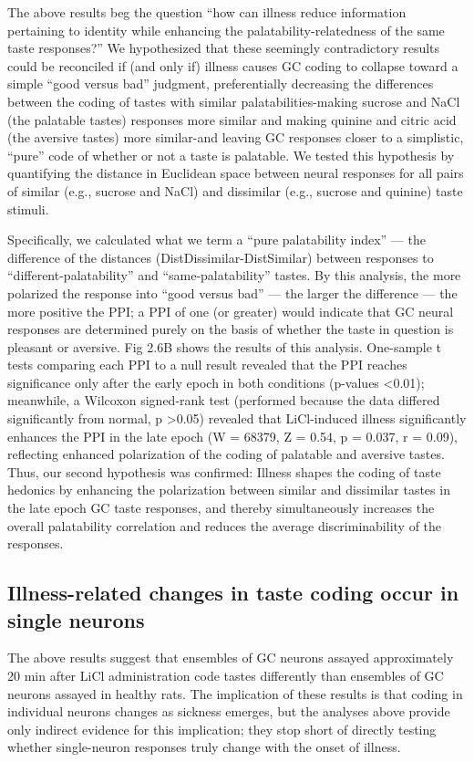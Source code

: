 \begin{refsection}
The above results beg the question “how can illness reduce information pertaining to identity while enhancing the palatability-relatedness of the same taste responses?” We hypothesized that these seemingly contradictory results could be reconciled if (and only if) illness causes GC coding to collapse toward a simple “good versus bad” judgment, preferentially decreasing the differences between the coding of tastes with similar palatabilities-making sucrose and NaCl (the palatable tastes) responses more similar and making quinine and citric acid (the aversive tastes) more similar-and leaving GC responses closer to a simplistic, “pure” code of whether or not a taste is palatable. We tested this hypothesis by quantifying the distance in Euclidean space between neural responses for all pairs of similar (e.g., sucrose and NaCl) and dissimilar (e.g., sucrose and quinine) taste stimuli.

Specifically, we calculated what we term a “pure palatability index” --- the difference of the distances (DistDissimilar-DistSimilar) between responses to “different-palatability” and “same-palatability” tastes. By this analysis, the more polarized the response into “good versus bad” --- the larger the difference --- the more positive the PPI; a PPI of one (or greater) would indicate that GC neural responses are determined purely on the basis of whether the taste in question is pleasant or aversive. Fig 2.6B shows the results of this analysis. One-sample t tests comparing each PPI to a null result revealed that the PPI reaches significance only after the early epoch in both conditions (p-values \textless 0.01); meanwhile, a Wilcoxon signed-rank test (performed because the data differed significantly from normal, p \textgreater0.05) revealed that LiCl-induced illness significantly enhances the PPI in the late epoch (W = 68379, Z = 0.54, p = 0.037, r = 0.09), reflecting enhanced polarization of the coding of palatable and aversive tastes. Thus, our second hypothesis was confirmed: Illness shapes the coding of taste hedonics by enhancing the polarization between similar and dissimilar tastes in the late epoch GC taste responses, and thereby simultaneously increases the overall palatability correlation and reduces the average discriminability of the responses.

\subsection{Illness-related changes in taste coding occur in single neurons}
The above results suggest that ensembles of GC neurons assayed approximately 20 min after LiCl administration code tastes differently than ensembles of GC neurons assayed in healthy rats. The implication of these results is that coding in individual neurons changes as sickness emerges, but the analyses above provide only indirect evidence for this implication; they stop short of directly testing whether single-neuron responses truly change with the onset of illness.


\end{refsection}
